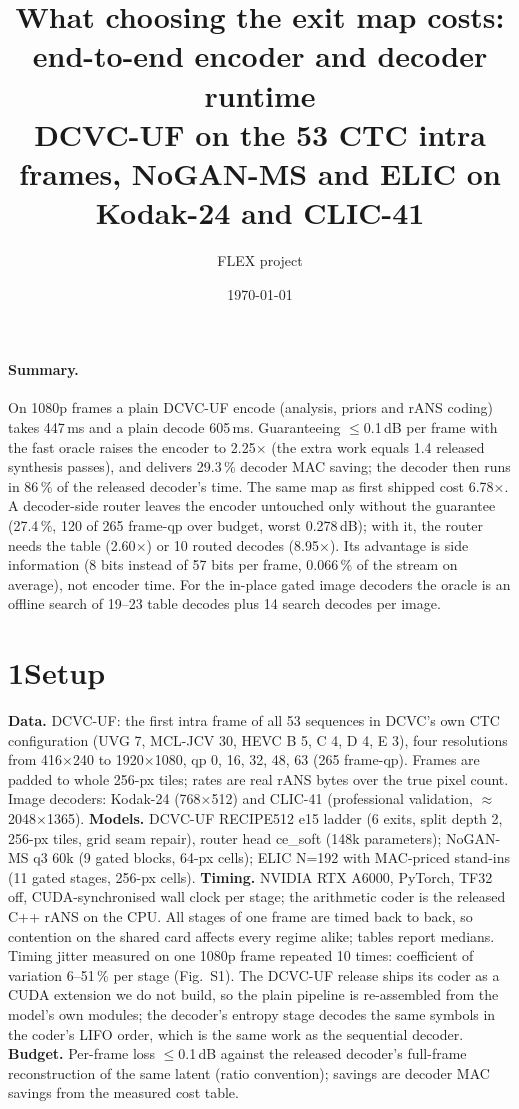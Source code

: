 \documentclass[10pt]{article}
\title{\vspace{-2.2em}What choosing the exit map costs: end-to-end encoder and decoder runtime\\\large DCVC-UF on the 53 CTC intra frames, NoGAN-MS and ELIC on Kodak-24 and CLIC-41}\author{FLEX project}\date{\today}
\begin{document}
\maketitle\vspace{-1.8em}
\paragraph{Summary.} On 1080p frames a plain DCVC-UF encode (analysis, priors and rANS coding) takes 447\,ms and a plain decode 605\,ms. Guaranteeing $\le$0.1\,dB per frame with the fast oracle raises the encoder to 2.25$\times$ (the extra work equals 1.4 released synthesis passes), and delivers 29.3\,\% decoder MAC saving; the decoder then runs in 86\,\% of the released decoder's time. The same map as first shipped cost 6.78$\times$. A decoder-side router leaves the encoder untouched only without the guarantee (27.4\,\%, 120 of 265 frame-qp over budget, worst 0.278\,dB); with it, the router needs the table (2.60$\times$) or 10 routed decodes (8.95$\times$). Its advantage is side information (8 bits instead of 57 bits per frame, 0.066\,\% of the stream on average), not encoder time. For the in-place gated image decoders the oracle is an offline search of 19--23 table decodes plus 14 search decodes per image.

\section*{1\quad Setup}
\textbf{Data.} DCVC-UF: the first intra frame of all 53 sequences in DCVC's own CTC configuration (UVG 7, MCL-JCV 30, HEVC B 5, C 4, D 4, E 3), four resolutions from 416$\times$240 to 1920$\times$1080, qp 0, 16, 32, 48, 63 (265 frame-qp). Frames are padded to whole 256-px tiles; rates are real rANS bytes over the true pixel count. Image decoders: Kodak-24 (768$\times$512) and CLIC-41 (professional validation, $\approx$2048$\times$1365).
\textbf{Models.} DCVC-UF RECIPE512 e15 ladder (6 exits, split depth 2, 256-px tiles, grid seam repair), router head ce\_soft (148k parameters); NoGAN-MS q3 60k (9 gated blocks, 64-px cells); ELIC N=192 with MAC-priced stand-ins (11 gated stages, 256-px cells).
\textbf{Timing.} NVIDIA RTX A6000, PyTorch, TF32 off, CUDA-synchronised wall clock per stage; the arithmetic coder is the released C++ rANS on the CPU. All stages of one frame are timed back to back, so contention on the shared card affects every regime alike; tables report medians. Timing jitter measured on one 1080p frame repeated 10 times: coefficient of variation 6--51\,\% per stage (Fig.~S1). The DCVC-UF release ships its coder as a CUDA extension we do not build, so the plain pipeline is re-assembled from the model's own modules; the decoder's entropy stage decodes the same symbols in the coder's LIFO order, which is the same work as the sequential decoder.
\textbf{Budget.} Per-frame loss $\le$0.1\,dB against the released decoder's full-frame reconstruction of the same latent (ratio convention); savings are decoder MAC savings from the measured cost table.
\end{document}

